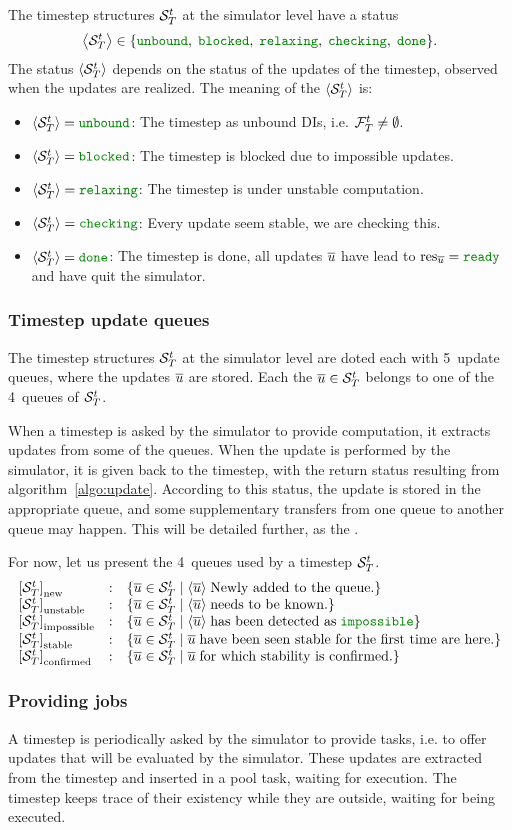 The timestep structures ${{\cal S}}_{T}^{t}$ at the simulator level have a status $$\cxStatusSet.$$ The status $\left< {{\cal S}}_{T}^{t} \right>$ depends on the status of the updates of the timestep, observed when the updates are realized. The meaning of the $\left< {{\cal S}}_{T}^{t} \right>$ is:
\begin{itemize}
\item $\cxStatusTSUnbound$: The timestep as unbound DIs, i.e. ${{{\cal F}}_{T}^{t}}\neq{\emptyset}$.
\item $\cxStatusTSBlocked$: The timestep is blocked due to impossible updates.
\item $\cxStatusTSRelaxing$: The timestep is under unstable computation.
\item $\cxStatusTSChecking$: Every update seem stable, we are checking this.
\item $\cxStatusTSDone$: The timestep is done, all updates $\overline{u}$ have lead to $\cxResUpdtReady$ and have quit the simulator.
\end{itemize}


\subsubsection{Timestep update queues}

The timestep structures ${{\cal S}}_{T}^{t}$ at the simulator level are doted each with 5~update queues, where the updates $\overline{u}$ are stored. Each the ${\overline{u}}\in{{{\cal S}}_{T}^{t}}$ belongs to one of the 4~queues of ${{\cal S}}_{T}^{t}$.

When a timestep is asked by the simulator to provide computation, it extracts updates from some of the queues. When the update is performed by the simulator, it is given back to the timestep, with the return status resulting from algorithm~\ref{algo:update}. According to this status, the update is stored in the appropriate queue, and some supplementary transfers from one queue to another queue may happen. This will be detailed further, as the .

For now, let us present the 4~queues used by a timestep ${{\cal S}}_{T}^{t}$.
\begin{equation}
  \cxQDefs \nonumber
\end{equation}


\subsubsection{Providing jobs \label{sec:providejobs}}

A timestep is periodically asked by the simulator to provide tasks, i.e. to offer updates that will be evaluated by the simulator. These updates are extracted from the timestep and inserted in a pool task, waiting for execution. The timestep keeps trace of their existency while they are outside, waiting for being executed.

